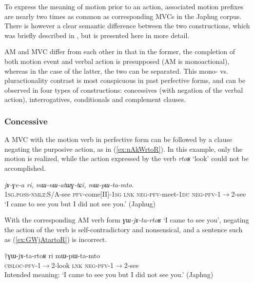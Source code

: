 \documentclass[oneside,a4paper,11pt]{article}
\newcommand{\ipa}[1]{{\phon\textit{#1}}}
\newcommand{\japhug}[2]{\textit{\phon#1} `#2'}
\newcommand{\fl}{$\rightarrow$}
\begin{document}
To express the meaning of motion prior to an action, associated motion prefixes are nearly two times as common as corresponding MVCs in the Japhug corpus. There is however a clear semantic difference between the two constructions, which was briefly described in \citet{jacques13harmonization}, but is presented here in more detail.

AM and MVC differ from each other in that in the former, the completion of both motion event and verbal action is presupposed (AM is monoactional), whereas in the case of the latter, the two can be separated. This mono- vs. pluractionality contrast is most conspicuous in past perfective forms, and can be observed in four types of constructions: concessives (with negation of the verbal action), interrogatives, conditionals and complement clauses.

\subsubsection{Concessive} \label{sec:am.concessive}
A MVC  with the motion verb in perfective form can be followed by a clause negating the purposive action, as in (\ref{ex:nAkWrtoR}). In this example, only the motion is realized, while the action expressed by the verb \japhug{rtoʁ}{look} could not be accomplished.

\begin{exe}
\ex \label{ex:nAkWrtoR}
\gll \ipa{nɤ-kɯ-rtoʁ}	\ipa{jɤ-ɣe-a}	\ipa{ri,}	\ipa{mɯ-nɯ-atɯɣ-tɕi,}	\ipa{mɯ-pɯ-ta-mto.} \\
\textsc{1sg.poss}-\textsc{nmlz}:S/A-see \textsc{pfv}-come[II]-\textsc{1sg} \textsc{lnk} \textsc{neg}-\textsc{pfv}-meet-\textsc{1du} \textsc{neg}-\textsc{pfv}-1\fl2-see \\
\glt `I came to see you but I did not see you.' (Japhug)
\end{exe}

With the corresponding AM verb form \japhug{ɣɯ-jɤ-ta-rtoʁ}{I came to see you}, negating the action of the verb is self-contradictory and nonsensical, and a sentence such as (\ref{ex:GWjAtartoR}) is incorrect.

\begin{exe}
\ex \label{ex:GWjAtartoR}
\gll $\dagger$ɣɯ-jɤ-ta-rtoʁ ri mɯ-pɯ-ta-mto \\
\textsc{cisloc}-\textsc{pfv}-1\fl2-look \textsc{lnk} \textsc{neg}-\textsc{pfv}-1\fl2-see \\
\glt Intended meaning: `I came to see you but I did not see you.'  (Japhug)
\end{exe}
\end{document}
